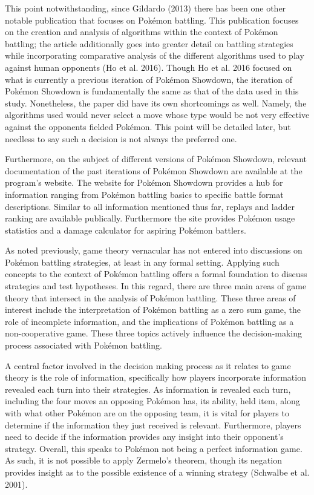 \documentclass[12pt,twoside]{reedthesis}
\begin{document}
  This point notwithstanding, since Gildardo (2013) there has been one
  other notable publication that focuses on Pokémon battling. This
  publication focuses on the creation and analysis of algorithms within
  the context of Pokémon battling; the article additionally goes into
  greater detail on battling strategies while incorporating comparative
  analysis of the different algorithms used to play against human
  opponents (Ho et al. 2016). Though Ho et al. 2016 focused on what is
  currently a previous iteration of Pokémon Showdown, the iteration of
  Pokémon Showdown is fundamentally the same as that of the data used in
  this study. Nonetheless, the paper did have its own shortcomings as
  well. Namely, the algorithms used would never select a move whose type
  would be not very effective against the opponents fielded Pokémon. This
  point will be detailed later, but needless to say such a decision is not
  always the preferred one.
  
  Furthermore, on the subject of different versions of Pokémon Showdown,
  relevant documentation of the past iterations of Pokémon Showdown are
  available at the program's website. The website for Pokémon Showdown
  provides a hub for information ranging from Pokémon battling basics to
  specific battle format descriptions. Similar to all information
  mentioned thus far, replays and ladder ranking are available publically.
  Furthermore the site provides Pokémon usage statistics and a damage
  calculator for aspiring Pokémon battlers.
  
  As noted previously, game theory vernacular has not entered into
  discussions on Pokémon battling strategies, at least in any formal
  setting. Applying such concepts to the context of Pokémon battling
  offers a formal foundation to discuss strategies and test hypotheses. In
  this regard, there are three main areas of game theory that intersect in
  the analysis of Pokémon battling. These three areas of interest include
  the interpretation of Pokémon battling as a zero sum game, the role of
  incomplete information, and the implications of Pokémon battling as a
  non-cooperative game. These three topics actively influence the
  decision-making process associated with Pokémon battling.
  
  A central factor involved in the decision making process as it relates
  to game theory is the role of information, specifically how players
  incorporate information revealed each turn into their strategies. As
  information is revealed each turn, including the four moves an opposing
  Pokémon has, its ability, held item, along with what other Pokémon are
  on the opposing team, it is vital for players to determine if the
  information they just received is relevant. Furthermore, players need to
  decide if the information provides any insight into their opponent's
  strategy. Overall, this speaks to Pokémon not being a perfect
  information game. As such, it is not possible to apply Zermelo's
  theorem, though its negation provides insight as to the possible
  existence of a winning strategy (Schwalbe et al. 2001).
  
\end{document}
